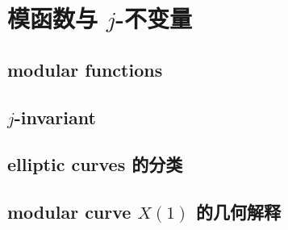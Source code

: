 \section{模函数与 \texorpdfstring{\(j\)}{j}-不变量}
\label{b3:sec:2306}


\subsection{modular functions}
\label{b3:subsec:230601}

\subsection{\texorpdfstring{\(j\)}{j}-invariant}
\label{b3:subsec:230602}

\subsection{elliptic curves 的分类}
\label{b3:subsec:230603}

\subsection{modular curve \texorpdfstring{\(X(1)\)}{X(1)} 的几何解释}
\label{b3:subsec:230604}


